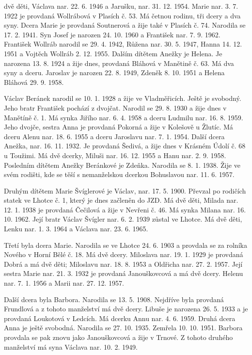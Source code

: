 \documentclass[../dejiny-rodu-prusiku.tex]{subfiles}
\begin{document}
dvě děti, Václava nar. 22. 6. 1946 a Jarušku, nar. 31. 12. 1954. Marie nar. 3. 7. 1922 je provdaná Wollrábová v Plasích č. 53. Má četnou rodinu, tři dcery a dva syny. Dcera Marie je provdaná Soutnerová a žije také v Plasích č. 74. Narodila se 17. 2. 1941. Syn Josef je narozen 24. 10. 1960 a František nar. 7. 9. 1962. František Wollráb narodil se 29. 4. 1942, Růžena nar. 30. 5. 1947, Hanna 14. 12. 1951 a Vojtěch Wollráb 2. 12. 1955. Dalším dítětem Anežky je Helena. Je narozena 13. 8. 1924 a žije dnes, provdaná Bláhová v Manětině č. 63. Má dva syny a dceru. Jaroslav je narozen 22. 8. 1949, Zdeněk 8. 10. 1951 a Helena Bláhová 29. 9. 1958.

Václav Beránek narodil se 10. 1. 1928 a žije ve Vladměřicích. Ještě je svobodný. Jeho bratr František pochá­zí z dvojčat. Narodil se 29. 8. 1930 a žije dnes v Manětíně č. 1. Má synka Jiřího nar. 6. 4. 1958 a dceru Lud­milu nar. 16. 8. 1959. Jeho dvojče, sestra Anna je provdaná Pokorná a žije v Kolešově u Žlutíc. Má dceru Alenu nar. 18. 6. 1955 a dceru Jaroslavu nar. 7. 1. 1954. Další dcera Anežka, nar. 16. 11. 1932. Je provdaná Šedivá, a žije dnes v Krásném Údolí č. 68 u Toužimi. Má dvě dcerky, Miluši nar. 16. 12. 1955 a Hanu nar. 2. 9. 1958. Posledním dítětem Anežky Beránkové je Zdeňka. Narodila se 8. 1. 1938. Žije ve svém rodišti, kde se těší s nemanželskou dcerkou Bohuslavou nar. 11. 6. 1957.

Druhým dítětem Marie Švíglerové je Václav, nar. 17. 5. 1900. Převzal po rodičích statek ve Lhotce č. 1, který je dnes začleněn do JZD. Má dvě děti, Milada nar. 12. 1. 1938 je provdaná Čečilová a žije v Nevřeni č. 46. Má synka Milana nar. 16. 10. 1962. Její bratr Václav Švígler nar. 6. 2. 1939 zůstal ve Lhotce. Má dvě děti, Lenku nar. 1. 3. 1964 a Václava nar. 23. 6. 1965.

Třetí byla dcera Marie. Narodila se ve Lhotce 24. 6. 1903 a provdala se za rolníka Nového v Horní Bělé č. 18. Má dvě dcery. Miloslava nar. 19. 1. 1929 je provdaná Dobrá a má dvě děti; Miloslavu nar. 18. 8. 1953 a Oldřicha nar. 27. 2. 1957. Její sestra Marie nar. 21. 3. 1932 je provdaná Janouškovcová a má dvě dcery. Helenu nar. 7. 1. 1956 a Marii nar. 27. 12. 1957.

Další dcera byla Barbora. Narodila se 13. 5. 1908. Nejdříve byla provdaná Frundlová a z tohoto manželství má dvě dcery. Libuše je narozena 26. 5. 1933 a je provdaná Loukotová v Ledcích. Má dcerku Annu nar. 4. 6. 1959. Druhá dcera Anna je ještě svobodná. Narodila se 27. 10. 1935. Zemřela 10. 10. 1951. Barbora provdala se pak znovu jako Janouškovcová a žije v Trnové. Z tohoto druhého manželství má syna Václava nar. 10. 2. 1949.
\end{document}
